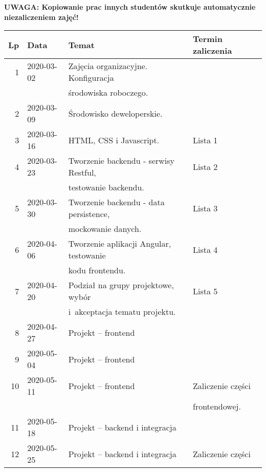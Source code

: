 \documentclass[12pt]{article}
\begin{document}
    \noindent\textbf{UWAGA: Kopiowanie prac innych studentów skutkuje automatycznie niezaliczeniem zajęć!}

    \begin{table}
        \centering
        \begin{tabular}{|r|l|l|l|}
            \hline
            \textbf{Lp}&\textbf{Data} &\textbf{Temat} &\textbf{Termin zaliczenia}\\
            \hline
            1   & 2020-03-02& Zajęcia organizacyjne. Konfiguracja       &\\
                &           & środowiska roboczego.                     &\\
            2   & 2020-03-09& Środowisko deweloperskie.                 &\\
            3   & 2020-03-16& HTML, CSS i Javascript.                   & Lista 1\\
            4   & 2020-03-23& Tworzenie backendu - serwisy Restful,     & Lista 2\\
                &           & testowanie backendu.                      &\\
            5   & 2020-03-30& Tworzenie backendu - data persistence,    & Lista 3\\
                &           & mockowanie danych.                        &\\
            6   & 2020-04-06& Tworzenie aplikacji Angular, testowanie   & Lista 4\\
                &           & kodu frontendu.                           &\\
            7   & 2020-04-20& Podział na grupy projektowe, wybór        & Lista 5\\
                &           & i~akceptacja tematu projektu.             &\\
            8   & 2020-04-27& Projekt -- frontend                       &\\
            9   & 2020-05-04& Projekt -- frontend                       &\\
            10  & 2020-05-11& Projekt -- frontend                       & Zaliczenie części \\
                &           &                                           & frontendowej.\\
            11  & 2020-05-18& Projekt -- backend i integracja           &\\
            12  & 2020-05-25& Projekt -- backend i integracja           & Zaliczenie części\\

\end{tabular}
\end{table}
\end{document}
